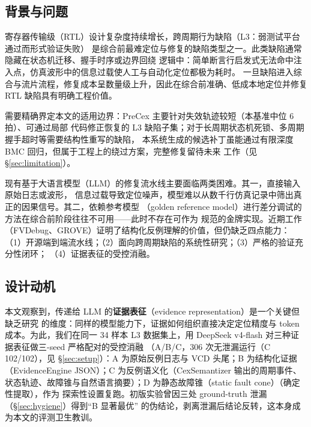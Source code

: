 \documentclass[twocolumn,10pt]{ctexart}
\begin{document}

\subsection*{背景与问题}

寄存器传输级（RTL）设计复杂度持续增长，跨周期行为缺陷（L3：弱测试平台通过而形式验证失败）
是综合前最难定位与修复的缺陷类型之一。此类缺陷通常隐藏在状态机迁移、握手时序或边界回绕
逻辑中：简单断言行启发式无法命中注入点，仿真波形中的信息过载使人工与自动化定位都极为耗时。
一旦缺陷进入综合与流片流程，修复成本呈数量级上升，因此在综合前准确、低成本地定位并修复
RTL 缺陷具有明确工程价值。

需要精确界定本文的适用边界：PreCex 主要针对失效轨迹较短（本基准中位 6 拍）、可通过局部
代码修正恢复的 L3 缺陷子集；对于长周期状态机死锁、多周期握手超时等需要结构性重写的缺陷，
本系统生成的候选补丁虽能通过有限深度 BMC 回归，但属于工程上的绕过方案，完整修复留待未来
工作（见 \S\ref{sec:limitation}）。

现有基于大语言模型（LLM）的修复流水线主要面临两类困难。其一，直接输入原始日志或波形，
信息过载导致定位噪声，模型难以从数千行仿真记录中筛出真正的因果信号。其二，依赖参考模型
（golden reference model）进行差分调试的方法在综合前阶段往往不可用——此时不存在可作为
规范的金牌实现。近期工作（FVDebug、GROVE）证明了结构化反例理解的价值，但仍缺乏四点能力：
（1）开源端到端流水线；（2）面向跨周期缺陷的系统性研究；（3）严格的验证充分性闭环；
（4）证据表征的受控消融。

\subsection*{设计动机}

本文观察到，传递给 LLM 的\textbf{证据表征}（evidence representation）是一个关键但缺乏研究
的维度：同样的模型能力下，证据如何组织直接决定定位精度与 token 成本。为此，我们在同一
34 样本 L3 数据集上，用 DeepSeek v4-flash 对三种证据表征做三-seed 严格配对的受控消融
（A/B/C，306 次无泄漏运行（C 102/102），见 \S\ref{sec:setup}）：A 为原始反例日志与 VCD
头尾；B 为结构化证据（EvidenceEngine JSON）；C 为反例语义化（CexSemantizer 输出的周期事件、
状态轨迹、故障锥与自然语言摘要）；D 为静态故障锥（static fault cone）（确定性提取），作为
探索性设置复跑。初版实验曾因三处 ground-truth 泄漏（\S\ref{sec:hygiene}）得到“B 显著最优”
的伪结论，剥离泄漏后结论反转，这本身成为本文的评测卫生教训。
\end{document}
